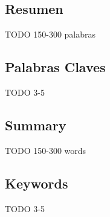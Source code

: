 \subsection*{Resumen}

TODO 150-300 palabras

\subsection*{Palabras Claves}

TODO 3-5

\subsection*{Summary}

TODO 150-300 words

\subsection*{Keywords}

TODO 3-5